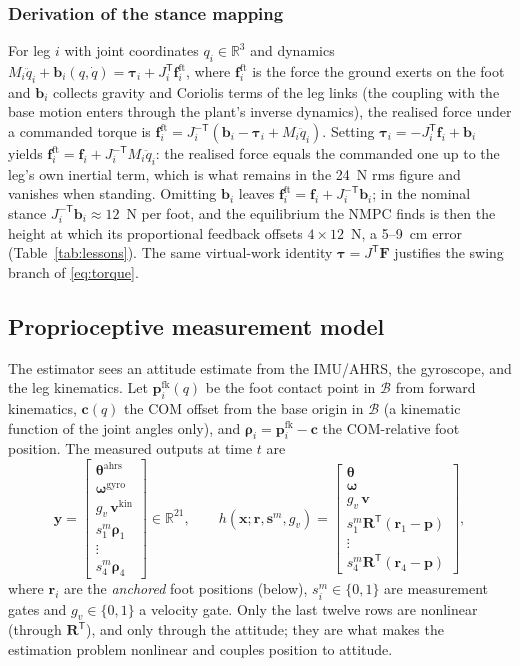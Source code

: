 \documentclass[11pt]{article}
\newcommand{\R}{\mathbb{R}}
\newcommand{\T}{^{\mathsf T}}
\newcommand{\bx}{\bm{x}}\newcommand{\bu}{\bm{u}}\newcommand{\bw}{\bm{w}}\newcommand{\by}{\bm{y}}
\newcommand{\bp}{\bm{p}}\newcommand{\bv}{\bm{v}}\newcommand{\bom}{\bm{\omega}}\newcommand{\bth}{\bm{\theta}}
\newcommand{\bfv}{\bm{f}}\newcommand{\br}{\bm{r}}\newcommand{\bd}{\bm{d}}\newcommand{\bs}{\bm{s}}
\newcommand{\Rot}{\bm{R}}\newcommand{\Tm}{\bm{T}}\newcommand{\I}{\bm{I}}
\begin{document}
\subsubsection{Derivation of the stance mapping}
For leg $i$ with joint coordinates $q_i\in\R^3$ and dynamics $M_i\ddot q_i+\bm b_i(q,\dot q)=\bm\tau_i+J_i\T\bfv^{\mathrm{ft}}_i$, where $\bfv^{\mathrm{ft}}_i$ is the force the ground exerts on the foot and $\bm b_i$ collects gravity and Coriolis terms of the leg links (the coupling with the base motion enters through the plant's inverse dynamics), the realised force under a commanded torque is $\bfv^{\mathrm{ft}}_i=J_i^{-\mathsf T}(\bm b_i-\bm\tau_i+M_i\ddot q_i)$. Setting $\bm\tau_i=-J_i\T\bfv_i+\bm b_i$ yields $\bfv^{\mathrm{ft}}_i=\bfv_i+J_i^{-\mathsf T}M_i\ddot q_i$: the realised force equals the commanded one up to the leg's own inertial term, which is what remains in the 24~N rms figure and vanishes when standing. Omitting $\bm b_i$ leaves $\bfv^{\mathrm{ft}}_i=\bfv_i+J_i^{-\mathsf T}\bm b_i$; in the nominal stance $J_i^{-\mathsf T}\bm b_i\approx12$~N per foot, and the equilibrium the NMPC finds is then the height at which its proportional feedback offsets $4\times12$~N, a 5--9~cm error (Table~\ref{tab:lessons}). The same virtual-work identity $\bm\tau=J\T\bm F$ justifies the swing branch of \eqref{eq:torque}.

\subsection{Proprioceptive measurement model}
The estimator sees an attitude estimate from the IMU/AHRS, the gyroscope, and the leg kinematics. Let $\bm p^{\mathrm{fk}}_i(q)$ be the foot contact point in $\mathcal B$ from forward kinematics, $\bm c(q)$ the COM offset from the base origin in $\mathcal B$ (a kinematic function of the joint angles only), and $\bm\rho_i=\bm p^{\mathrm{fk}}_i-\bm c$ the COM-relative foot position. The measured outputs at time $t$ are
\begin{equation}
\by=\begin{bmatrix}\bth^{\mathrm{ahrs}}\\ \bom^{\mathrm{gyro}}\\ g_v\,\bv^{\mathrm{kin}}\\ s^m_1\bm\rho_1\\ \vdots\\ s^m_4\bm\rho_4\end{bmatrix}\in\R^{21},
\qquad
h(\bx;\br,\bs^m,g_v)=\begin{bmatrix}\bth\\ \bom\\ g_v\,\bv\\ s^m_1\Rot\T(\br_1-\bp)\\ \vdots\\ s^m_4\Rot\T(\br_4-\bp)\end{bmatrix},
\label{eq:h}
\end{equation}
where $\br_i$ are the \emph{anchored} foot positions (below), $s^m_i\in\{0,1\}$ are measurement gates and $g_v\in\{0,1\}$ a velocity gate. Only the last twelve rows are nonlinear (through $\Rot\T$), and only through the attitude; they are what makes the estimation problem nonlinear and couples position to attitude.
\end{document}
